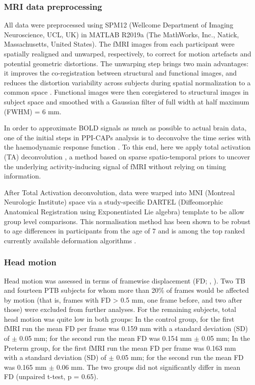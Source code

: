 \subsubsection{MRI data preprocessing} 
All data were preprocessed using SPM12 (Wellcome Department of Imaging Neuroscience, UCL, UK) in MATLAB R2019a (The MathWorks, Inc., Natick, Massachusetts, United States). The fMRI images from each participant were spatially realigned and unwarped, respectively, to correct for motion artefacts and potential geometric distortions. The unwarping step brings two main advantages: it improves the co-registration between structural and functional images, and reduces the distortion variability across subjects during spatial normalization to a common space \citep{Hutton2002}. Functional images were then coregistered to structural images in subject space and smoothed with a Gaussian filter of full width at half maximum (FWHM) = 6 mm. 

In order to approximate BOLD signals as much as possible to actual brain data, one of the initial steps in PPI-CAPs analysis is to deconvolve the time series with the haemodynamic response function \citep{Freitas2020}. To this end, here we apply total activation (TA) deconvolution \citep{Karahanoglu2013}, a method based on sparse spatio-temporal priors to uncover the underlying activity-inducing signal of fMRI without relying on timing information.

After Total Activation deconvolution, data were warped into MNI (Montreal Neurologic Institute) space via a study-specific DARTEL (Diffeomorphic Anatomical Registration using Exponentiated Lie algebra) template to be allow group level comparisons. This normalisation method has been shown to be robust to age differences in participants from the age of 7 \citep{ASHBURNER1998, Burgund2002} and is among the top ranked currently available deformation algorithms \citep{Klein2009}.  


\subsubsection{Head motion} 
Head motion was assessed in terms of framewise displacement (FD; \citeauthor{Power2014a}, \citeyear{Power2014a}). Two TB and fourteen PTB subjects for whom more than 20\% of frames would be affected by motion (that is, frames with FD > 0.5 mm, one frame before, and two after those) were excluded from further analyses. For the remaining subjects, total head motion was quite low in both groups: In the control group, for the first fMRI run the mean FD per frame was 0.159 mm with a standard deviation (SD) of $\pm$ 0.05 mm; for the second run the mean FD was 0.154 mm $\pm$ 0.05 mm; In the Preterm group, for the first fMRI run the mean FD per frame was 0.163 mm with a standard deviation (SD) of $\pm$ 0.05 mm; for the second run the mean FD was 0.165 mm $\pm$ 0.06 mm. The two groups did not significantly differ in mean FD (unpaired t-test, p = 0.65). 


